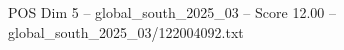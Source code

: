 \begin{textsample}{POS Dim 5 – global\_south\_2025\_03 – Score 12.00 – global\_south\_2025\_03/122004092.txt}
\end{textsample}
